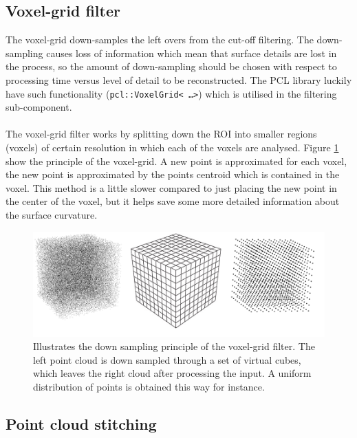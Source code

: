 \subsection{Voxel-grid filter}
The voxel-grid down-samples the left overs from the cut-off filtering. The down-sampling causes loss of information which mean that surface details are lost in the process, so the amount of down-sampling should be chosen with respect to processing time versus level of detail to be reconstructed. The PCL library luckily have such functionality (\texttt{pcl::VoxelGrid< \ldots >}) which is utilised in the filtering sub-component.\\
\\
The voxel-grid filter works by splitting down the ROI into smaller regions (voxels) of certain resolution in which each of the voxels are analysed. Figure \ref{fig:filtering_voxel_grid} show the principle of the voxel-grid. A new point is approximated for each voxel, the new point is approximated by the points centroid which is contained in the voxel. This method is a little slower compared to just placing the new point in the center of the voxel, but it helps save some more detailed information about the surface curvature.
\begin{figure}[htb]
	\begin{center}
		\includegraphics[scale=0.4,trim=0 0 0 0]{graphics/07_modelling/voxelgrid.png}%
		\caption{Illustrates the down sampling principle of the voxel-grid filter. The left point cloud is down sampled through a set of virtual cubes, which leaves the right cloud after processing the input. A uniform distribution of points is obtained this way for instance.}
		\label{fig:filtering_voxel_grid}
	\end{center}
\end{figure}

\subsection{Point cloud stitching}

